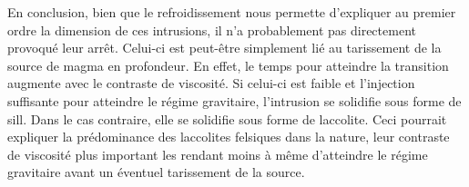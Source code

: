 En conclusion,  bien que le refroidissement  nous permette d'expliquer
au premier ordre  la dimension de ces intrusions,  il n’a probablement
pas directement provoqué leur arrêt. Celui-ci est peut-être simplement
lié au tarissement  de la source de magma en  profondeur. En effet, le
temps  pour atteindre  la  transition augmente  avec  le contraste  de
viscosité.   Si celui-ci  est faible  et l'injection  suffisante pour
atteindre le régime gravitaire, l'intrusion se solidifie sous forme de
sill.  Dans  le  cas  contraire,  elle  se  solidifie  sous  forme  de
laccolite.  Ceci pourrait  expliquer  la  prédominance des  laccolites
felsiques dans la  nature, leur contraste de  viscosité plus important
les rendant  moins à  même d'atteindre le  régime gravitaire  avant un
éventuel tarissement de la source.

